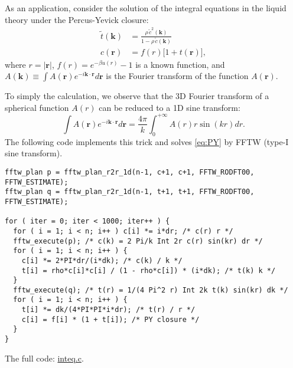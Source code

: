 \documentclass[12pt]{article}
\newcommand{\vct}[1]{\mathbf{#1}}
\begin{document}
As an application, consider the solution of
  the integral equations in the liquid theory
  under the Percus-Yevick closure:
%
%
%
\newcommand{\FC}[1]{\tilde{#1}}
\newcommand{\vk}{\vct{k}}
\newcommand{\vr}{\vct{r}}
%
%
%
\begin{equation}
\begin{split}
  \FC{t}(\vk)
          &= \frac{ \rho \, \FC{c}^2(\vk) }
                  { 1 - \rho \, \FC{c}(\vk) } \\
  c(\vr)  &= f(r) \big[
                    1 + t(\vr)
                  \big],
\end{split}
\label{eq:PY}
\end{equation}
%
%
%
where $r = |\vr|$, $f(r) = e^{-\beta u(r)} - 1$ is a known function,
 and $A(\vk) \equiv \int A(\vr) e^{-i\vk\cdot\vr} d\vr$
 is the Fourier transform of the function $A(\vr)$.

To simply the calculation, we observe that
  the 3D Fourier transform of a spherical function $A(r)$
  can be reduced to a 1D sine transform:
\begin{equation}
  \int A(\vr) e^{-i\vk\cdot\vr} d\vr
  = \frac{4\pi}{k} \int_0^{+\infty} A(r) r \sin(kr) dr.
\end{equation}
%
The following code implements this trick
  and solves \eqref{eq:PY} by FFTW (type-I sine transform).
%
%
%
{\footnotesize
\begin{verbatim}
fftw_plan p = fftw_plan_r2r_1d(n-1, c+1, c+1, FFTW_RODFT00, FFTW_ESTIMATE);
fftw_plan q = fftw_plan_r2r_1d(n-1, t+1, t+1, FFTW_RODFT00, FFTW_ESTIMATE);

for ( iter = 0; iter < 1000; iter++ ) {
  for ( i = 1; i < n; i++ ) c[i] *= i*dr; /* c(r) r */
  fftw_execute(p); /* c(k) = 2 Pi/k Int 2r c(r) sin(kr) dr */
  for ( i = 1; i < n; i++ ) {
    c[i] *= 2*PI*dr/(i*dk); /* c(k) / k */
    t[i] = rho*c[i]*c[i] / (1 - rho*c[i]) * (i*dk); /* t(k) k */
  }
  fftw_execute(q); /* t(r) = 1/(4 Pi^2 r) Int 2k t(k) sin(kr) dk */
  for ( i = 1; i < n; i++ ) {
    t[i] *= dk/(4*PI*PI*i*dr); /* t(r) / r */
    c[i] = f[i] * (1 + t[i]); /* PY closure */
  }
}
\end{verbatim}
}
%
%
%
The full code: \url{inteq.c}.
\end{document}
